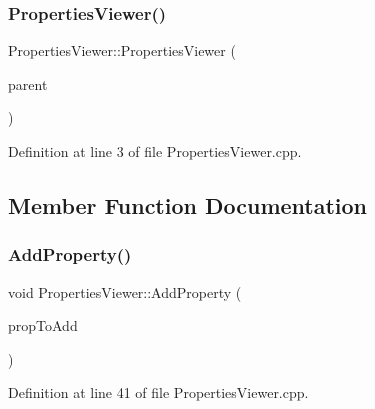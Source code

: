 \subsubsection{\texorpdfstring{Properties\+Viewer()}{PropertiesViewer()}}
{\footnotesize\ttfamily Properties\+Viewer\+::\+Properties\+Viewer (\begin{DoxyParamCaption}\item[{wx\+Window $\ast$}]{parent }\end{DoxyParamCaption})}



Definition at line 3 of file Properties\+Viewer.\+cpp.



\subsection{Member Function Documentation}
\mbox{\label{class_properties_viewer_ae8fe6d69893153aa755656e9db880bfd}} 
\subsubsection{\texorpdfstring{Add\+Property()}{AddProperty()}}
{\footnotesize\ttfamily void Properties\+Viewer\+::\+Add\+Property (\begin{DoxyParamCaption}\item[{wx\+P\+G\+Property $\ast$}]{prop\+To\+Add }\end{DoxyParamCaption})}



Definition at line 41 of file Properties\+Viewer.\+cpp.

